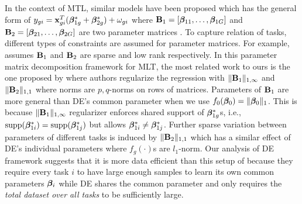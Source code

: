 In the context of MTL, similar models have been proposed which has the general form of $y_{gi} = \mathbf{x}_{gi}^T (\boldsymbol{\beta}_{1g}^* + \boldsymbol{\beta}^*_{2g}) + \omega_{gi}$ where $\mathbf{B}_1 = [\boldsymbol{\beta}_{11}, \dots, \boldsymbol{\beta}_{1G}]$ and $\mathbf{B}_2 = [\boldsymbol{\beta}_{21}, \dots, \boldsymbol{\beta}_{2G}]$ are two parameter matrices \cite{Zhang2017-rm}. To capture relation of tasks, different types of constraints are assumed for parameter matrices. For example, \cite{Chen2012-fb} assumes $\mathbf{B}_1$ and $\mathbf{B}_2$ are sparse and low rank respectively. In this parameter matrix decomposition framework for MLT, the most related work to ours is the one proposed by \cite{jrsr10} where authors regularize the regression with $\|\mathbf{B}_1\|_{1, \infty}$ and $\|\mathbf{B}_2\|_{1,1}$ where norms are $p,q$-norms on rows of matrices. Parameters of $\mathbf{B}_1$ are more general than DE's common parameter when we use  $f_0(\boldsymbol{\beta}_0) = \|\boldsymbol{\beta}_0\|_{1}$. This is because $\|\mathbf{B}_1\|_{1, \infty}$ regularizer enforces shared support of $\boldsymbol{\beta}^*_{1g}$s, i.e., $\text{supp}(\boldsymbol{\beta}_{1i}^*) = \text{supp}(\boldsymbol{\beta}_{1j}^*)$ but allows $\boldsymbol{\beta}_{1i}^* \neq \boldsymbol{\beta}_{1j}^*$. Further sparse variation between parameters of different tasks is induced by $\|\mathbf{B}_2\|_{1,1}$ which has  a similar effect of DE's individual parameters where $f_g(\cdot)$s are $l_1$-norm. Our analysis of DE framework suggests that it is more data efficient than this setup of \cite{jrsr10} because they require every task $i$ to have large enough samples to learn its own common parameters $\boldsymbol{\beta}_i$ while DE shares the common parameter and only requires the {\em{total dataset over all tasks}} to be sufficiently large.



